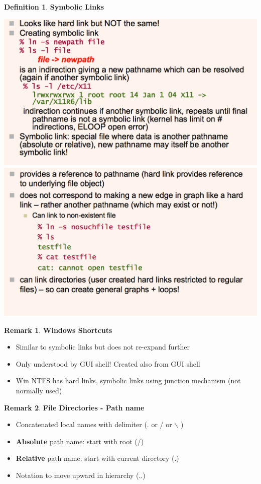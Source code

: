 \documentclass[11pt,a4paper]{article}
\theoremstyle{definition}
\newtheorem*{remark}{Remark}
\newtheorem{definition}{Definition}[section]
\newenvironment{myitemize}
{ \begin{itemize}
    \setlength{\itemsep}{5pt}
    \setlength{\parskip}{0pt}
    \setlength{\parsep}{0pt}     }
{ \end{itemize}                  }
\begin{document}
\begin{definition}{\textbf{Symbolic Links}}
	\vspace{3mm}
	
	\hspace{-15mm}
	\includegraphics[scale=0.36]{m2/symbolicLink1}
	\includegraphics[scale=0.36]{m2/symbolicLink2}
	
\end{definition}

\begin{remark}{\textbf{Windows Shortcuts}}
	\begin{myitemize}
		\item Similar to symbolic links but does not re-expand further
		\item Only understood by GUI shell! Created also from GUI shell
		\item Win NTFS has hard links, symbolic links using junction mechanism (not normally used)
	\end{myitemize}
\end{remark}

\begin{remark}{\textbf{File Directories - Path name}}
	\begin{myitemize}
		\item Concatenated local names with delimiter (. or / or $\backslash$ )
		\item \textbf{Absolute} path name: start with root (/)
		\item \textbf{Relative} path name: start with current directory (.)
		\item Notation to move upward in hierarchy (..)
	\end{myitemize}
\end{remark}
\end{document}
